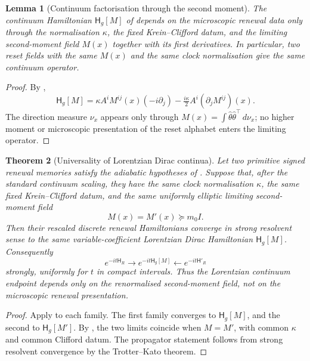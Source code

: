 \documentclass[11pt]{article}
\newtheorem{theorem}{Theorem}[section]
\newtheorem{lemma}[theorem]{Lemma}
\theoremstyle{definition}
\theoremstyle{remark}
\newcommand{\Ham}{\mathsf{H}}
\begin{document}
\begin{lemma}[Continuum factorisation through the second moment]
\label{lem:continuum-factorisation}
The continuum Hamiltonian \(\Ham_g[M]\) of  depends on the
microscopic renewal data only through the normalisation \(\kappa\), the fixed
Krein--Clifford datum, and the limiting second-moment field \(M(x)\) together
with its first derivatives.  In particular, two reset fields with the same
\(M(x)\) and the same clock normalisation give the same continuum operator.
\end{lemma}

\begin{proof}
By ,
\[
  \Ham_g[M]
  =\kappa A^iM^{ij}(x)(-i\partial_j)
        -\tfrac{i\kappa}{2}A^i(\partial_jM^{ij})(x).
\]
The direction measure \(\nu_x\) appears only through
\(M(x)=\int \hat\theta\hat\theta^{\top}\,d\nu_x\); no higher moment or
microscopic presentation of the reset alphabet enters the limiting operator.
\end{proof}

\begin{theorem}[Universality of Lorentzian Dirac continua]
\label{thm:universality}
Let two primitive signed renewal memories satisfy the adiabatic hypotheses of
.  Suppose that, after the standard continuum scaling,
they have the same clock normalisation \(\kappa\), the same fixed
Krein--Clifford datum, and the same uniformly elliptic limiting second-moment
field
\[
  M(x)=M'(x)\succeq m_0I.
\]
Then their rescaled discrete renewal Hamiltonians converge in strong resolvent
sense to the same variable-coefficient Lorentzian Dirac Hamiltonian
\(\Ham_g[M]\).  Consequently
\[
  e^{-it\Ham_R}\longrightarrow e^{-it\Ham_g[M]}
  \longleftarrow e^{-it\Ham'_R}
\]
strongly, uniformly for \(t\) in compact intervals.  Thus the Lorentzian
continuum endpoint depends only on the renormalised second-moment field, not on
the microscopic renewal presentation.
\end{theorem}

\begin{proof}
Apply  to each family.  The first family converges to
\(\Ham_g[M]\), and the second to \(\Ham_g[M']\).  By
, the two limits coincide when
\(M=M'\), with common \(\kappa\) and common Clifford datum.  The propagator
statement follows from strong resolvent convergence by the Trotter--Kato
theorem.
\end{proof}
\end{document}
